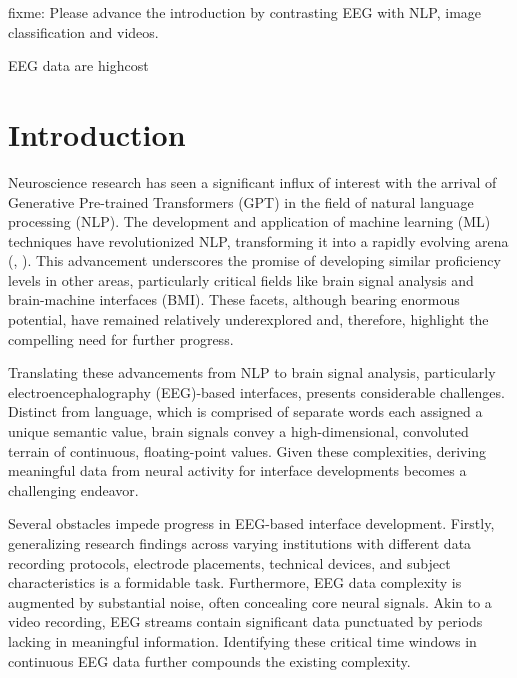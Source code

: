 \documentclass[final,3p,times,twocolumn]{elsarticle}
\begin{document}
fixme:
Please advance the introduction by contrasting EEG with NLP, image classification and videos.

EEG data are highcost


\section{Introduction}

Neuroscience research has seen a significant influx of interest with the arrival of Generative Pre-trained Transformers (GPT) in the field of natural language processing (NLP). The development and application of machine learning (ML) techniques have revolutionized NLP, transforming it into a rapidly evolving arena (\cite{NIPS2017_3f5ee243}, \cite{radford_language_nodate}). This advancement underscores the promise of developing similar proficiency levels in other areas, particularly critical fields like brain signal analysis and brain-machine interfaces (BMI). These facets, although bearing enormous potential, have remained relatively underexplored and, therefore, highlight the compelling need for further progress.

Translating these advancements from NLP to brain signal analysis, particularly electroencephalography (EEG)-based interfaces, presents considerable challenges. Distinct from language, which is comprised of separate words each assigned a unique semantic value, brain signals convey a high-dimensional, convoluted terrain of continuous, floating-point values. Given these complexities, deriving meaningful data from neural activity for interface developments becomes a challenging endeavor.

Several obstacles impede progress in EEG-based interface development. Firstly, generalizing research findings across varying institutions with different data recording protocols, electrode placements, technical devices, and subject characteristics is a formidable task. Furthermore, EEG data complexity is augmented by substantial noise, often concealing core neural signals. Akin to a video recording, EEG streams contain significant data punctuated by periods lacking in meaningful information. Identifying these critical time windows in continuous EEG data further compounds the existing complexity.
\end{document}
